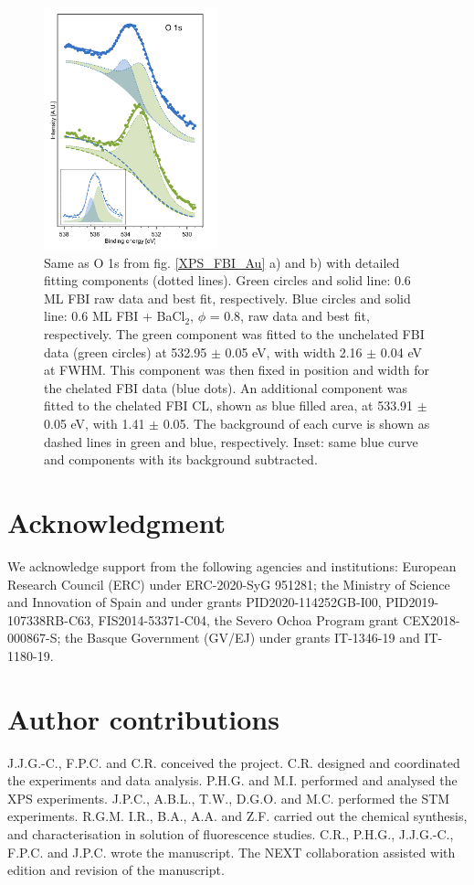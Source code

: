 \documentclass[aps,prl,reprint,longbibliography,superscriptaddress, english]{revtex4-1}
\begin{document}
\begin{figure}[ht!]
	\includegraphics[width=0.45\textwidth]{figures/fig6_fit.pdf}
	\caption{\label{XPS_fits} Same as O 1s from fig. \ref{XPS_FBI_Au} a) and b) with detailed fitting components (dotted lines). Green circles and solid line: 0.6 ML FBI raw data and best fit, respectively. Blue circles and solid line: 0.6 ML FBI + BaCl$_2$, $\phi$ = 0.8,  raw data and best fit, respectively. The green component was fitted to the unchelated FBI data (green circles) at 532.95 $\pm$ 0.05 eV, with width 2.16 $\pm$ 0.04 eV at FWHM. This component was then fixed in position and width for the chelated FBI data (blue dots). An additional component was fitted to the chelated FBI CL, shown as blue filled area, at 533.91 $\pm$ 0.05 eV,  with 1.41 $\pm$ 0.05. The background of each curve is shown as dashed lines in green and blue, respectively. Inset: same blue curve and components with its background subtracted.}
\end{figure}  

 


\section{Acknowledgment}
We acknowledge support from the following agencies and institutions: European Research Council (ERC) under ERC-2020-SyG 951281; the Ministry of Science and Innovation of Spain and under grants PID2020-114252GB-I00, PID2019-107338RB-C63,  FIS2014-53371-C04, the Severo Ochoa Program
grant CEX2018-000867-S; the Basque Government (GV/EJ) under grants IT-1346-19 and IT-1180-19. 
\section{Author contributions}
J.J.G.-C., F.P.C. and C.R. conceived the project. C.R. designed and coordinated the experiments and data analysis. P.H.G. and M.I. performed and analysed the XPS experiments. J.P.C., A.B.L., T.W., D.G.O. and M.C. performed the STM experiments. R.G.M. I.R., B.A., A.A. and Z.F. carried out the chemical synthesis, and characterisation in solution of fluorescence studies. C.R., P.H.G., J.J.G.-C., F.P.C. and J.P.C. wrote the manuscript. The NEXT collaboration assisted with edition and revision of the manuscript. 
\end{document}
